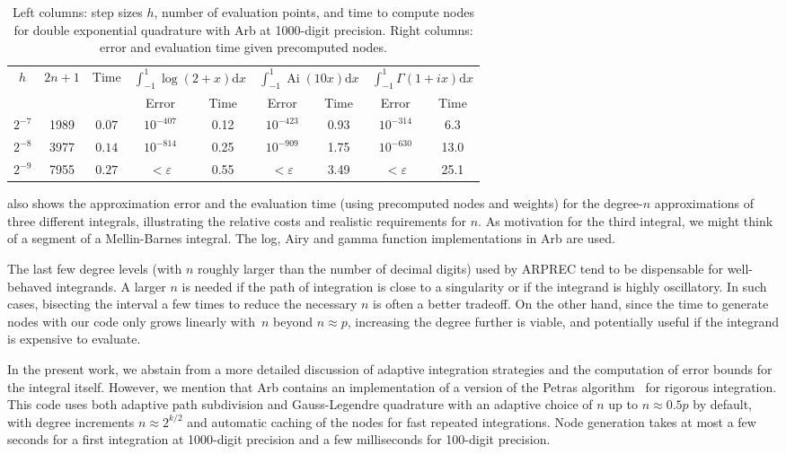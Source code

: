 \documentclass[nohypdvips,review]{siamart0216}
\newcommand{\dx}{\mathrm d x}
\begin{document}
\begin{table}[h!]
\caption{Left columns: step sizes $h$, number of evaluation
points, and time to compute nodes for double exponential quadrature with Arb
at 1000-digit precision. Right columns: error and evaluation
time given precomputed nodes.}
\begin{center}
\begin{tabular}{ c c c | c c | c c | c c }
$h$ & $2n+1$ & Time &
    \multicolumn{2}{|c|}{$\int_{-1}^{1}\!\log(2\!+\!x) \dx$} &
    \multicolumn{2}{|c|}{$\int_{-1}^{1}\!\operatorname{Ai}(10 x) \dx$} &
    \multicolumn{2}{|c}{$\int_{-1}^{1}\!\Gamma(1\!+\!ix) \dx$} \\
   &         &          & Error   & Time      &  Error & Time  &  Error & Time \\ \hline
\rule{0pt}{3ex}$2^{-7}$ & 1989 & $0.07$ & $10^{-407}$ & 0.12 & $10^{-423}$ & 0.93 & $10^{-314}$ & 6.3 \\
$2^{-8}$ & 3977 & $0.14$ & $10^{-814}$ & 0.25 & $10^{-909}$ & 1.75 & $10^{-630}$ & 13.0 \\
$2^{-9}$ & 7955 & $0.27$ & $<\varepsilon$ & 0.55 & $<\varepsilon$ & 3.49 & $<\varepsilon$ & 25.1
\end{tabular}
\label{tab:dequad}
\end{center}
\end{table}

 also
shows the approximation error
and the evaluation time (using precomputed nodes and weights)
for the degree-$n$ approximations of three different integrals,
illustrating the relative costs and realistic requirements for $n$.
As motivation for the third integral, we might think
of a segment of a Mellin-Barnes integral.
The log, Airy and gamma function implementations in Arb are used.

The last few degree levels (with $n$ roughly larger than
the number of decimal digits) used by ARPREC
tend to be dispensable for well-behaved integrands.
A larger $n$ is needed if the path of integration
is close to a singularity or if the integrand is highly oscillatory.
In such cases, bisecting the interval a few times
to reduce the necessary $n$ is often a better tradeoff.
On the other hand, since the time to generate nodes with our code only
grows linearly with~$n$ beyond $n \approx p$,
increasing the degree further is viable,
and potentially useful if the integrand is expensive to evaluate.

In the present work, we abstain from a more detailed discussion of
adaptive integration strategies and the computation
of error bounds for the integral itself.
However, we mention that Arb contains an implementation of a
version of the Petras algorithm~\cite{petras2002self} for rigorous
integration. This code uses both adaptive path subdivision
and Gauss-Legendre quadrature with an adaptive choice of $n$ up to
$n \approx 0.5p$ by default, with degree increments
$n \approx 2^{k/2}$ and automatic caching of the nodes
for fast repeated integrations.
Node generation takes at most a few seconds for a first integration
at 1000-digit precision
and a few milliseconds for 100-digit precision.
\end{document}
